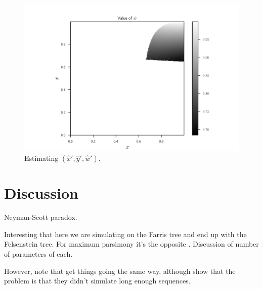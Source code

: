 \documentclass{article}
\begin{document}
\begin{figure}
\centering
\includegraphics[width=.9\textwidth]{w-hat-empirical-001}
\caption{
    Estimating $(\hat{x}', \hat{y}', \hat{w}')$.
}
\label{fig:w_hat_joint}
\end{figure}

\section{Discussion}

Neyman-Scott paradox.

Interesting that here we are simulating on the Farris tree and end up with the Felsenstein tree.
For maximum parsimony it's the opposite \cite{Felsenstein1978-rr}.
Discussion of number of parameters of each.

However, note that \cite{Siddall1998-hq} get things going the same way, although \cite{Swofford2001-hr} show that the problem is that they didn't simulate long enough sequences.





\newpage


\end{document}
